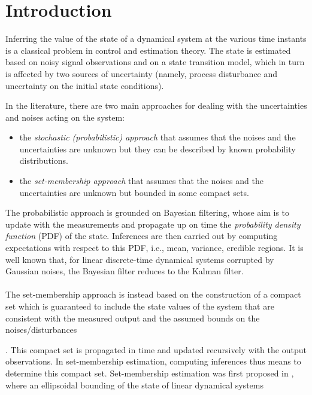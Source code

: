 \documentclass[twocolumn]{autart}
\newcommand{\DP}[1]{{#1}}
\begin{document}
\section{Introduction} \vspace{-3mm}
Inferring the value of the state of a dynamical system at the various time instants is a classical problem in control and estimation theory. The state is estimated based on noisy signal observations and on a state transition model, which in turn is affected by two sources of uncertainty (namely, process \DP{disturbance} and uncertainty on the initial state conditions).
{
In the literature, there are two main approaches for dealing with the uncertainties and noises acting on the system:
 \begin{itemize}
   \item the \textit{stochastic (probabilistic) approach} that assumes that the noises and the  uncertainties are unknown
but they can be described by known probability distributions.
   \item  the \textit{set-membership approach} that assumes that the noises and the  uncertainties are unknown
but bounded \DP{in} some compact sets.
\end{itemize}
The probabilistic approach is grounded on  Bayesian filtering, whose aim is
to update with the measurements and propagate up on time the \emph{probability density function} (PDF) of the state.
Inferences are then carried out by computing expectations \DP{with respect to}  this PDF, i.e., mean, variance, credible regions.
It is well known that, for linear discrete-time dynamical systems corrupted by Gaussian noises, \DP{the} Bayesian filter reduces to \DP{the}  Kalman filter.\\
~\\
The set-membership approach is instead based on the construction of a compact set which is guaranteed to include  the
state values of the system that are consistent with the measured output and the assumed  bounds on the noises/disturbances \cite{milvic,Combettes1993,minoplwa,Milanese11,Piga2011set,casinifeas2014}}.
This compact set is propagated \DP{in} time and updated recursively with the output observations.
In set-membership estimation, computing inferences thus means to determine this compact set. Set-membership estimation was first proposed in  \cite{Schweppe67,Bertsekas71}, where an ellipsoidal bounding of the state of linear dynamical systems
\end{document}
